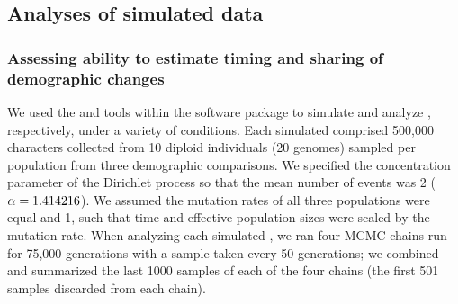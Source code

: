 
\subsection{Analyses of simulated data}

\subsubsection{Assessing ability to estimate timing and sharing of demographic changes}

We used the \simcoevolity and \ecoevolity tools within the \ecoevolity software
package
\citep{Oaks2018ecoevolity}
to simulate and analyze \datasets, respectively, under a variety of conditions.
Each simulated \dataset comprised 500,000 characters collected from 10 diploid
individuals (20 genomes) sampled per population from three demographic
comparisons.
We specified the concentration parameter of the Dirichlet process so that
the mean number of events was 2 ($\alpha = 1.414216$).
We assumed the mutation rates of all three populations were equal and 1, such
that time and effective population sizes were scaled by the mutation rate.
When analyzing each simulated \dataset, we ran four MCMC chains run for 75,000
generations with a sample taken every 50 generations; we combined and
summarized the last 1000 samples of each of the four chains (the first 501
samples discarded from each chain).


